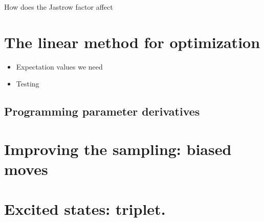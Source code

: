 \documentclass[12pt]{article}
\begin{document}
How does the Jastrow factor affect 

\section{The linear method for optimization} 

\begin{itemize}
\item Expectation values we need
\item Testing 
\end{itemize}

\subsection{Programming parameter derivatives}


\section{Improving the sampling: biased moves} 

\section{Excited states: triplet. } 
\end{document}

